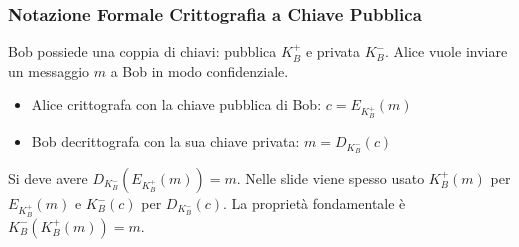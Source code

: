 \subsubsection{Notazione Formale Crittografia a Chiave Pubblica}
\label{ssubsec:notazione_asimmetrica}
Bob possiede una coppia di chiavi: pubblica $K_B^+$ e privata $K_B^-$.
Alice vuole inviare un messaggio $m$ a Bob in modo confidenziale.
\begin{itemize}
    \item Alice crittografa con la chiave pubblica di Bob: $c = E_{K_B^+}(m)$
    \item Bob decrittografa con la sua chiave privata: $m = D_{K_B^-}(c)$
\end{itemize}
Si deve avere $D_{K_B^-}(E_{K_B^+}(m)) = m$.
Nelle slide viene spesso usato $K_B^+(m)$ per $E_{K_B^+}(m)$ e $K_B^-(c)$ per $D_{K_B^-}(c)$.
La proprietà fondamentale è $K_B^-(K_B^+(m)) = m$.

